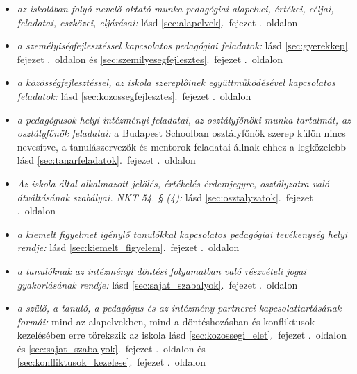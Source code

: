 \begin{itemize}
   

\item \emph{az iskolában folyó nevelő-oktató munka pedagógiai alapelvei, értékei, céljai, feladatai, eszközei, eljárásai: }    
       lásd        \ref{sec:alapelvek}.~fejezet .~oldalon
              
\item \emph{a személyiségfejlesztéssel kapcsolatos pedagógiai feladatok: }    
       lásd        \ref{sec:gyerekkep}. fejezet .~oldalon és 
              \ref{sec:szemilyesegfejlesztes}.~fejezet .~oldalon
              
\item \emph{a közösségfejlesztéssel, az iskola szereplőinek együttműködésével kapcsolatos feladatok: }    
       lásd        \ref{sec:kozossegfejlesztes}.~fejezet .~oldalon
              
\item \emph{a pedagógusok helyi intézményi feladatai, az osztályfőnöki munka tartalmát, az osztályfőnök feladatai: }   a Budapest Schoolban osztályfőnök szerep külön nincs nevesítve, a tanulászervezők és mentorok feladatai állnak ehhez a legközelebb 
       lásd        \ref{sec:tanarfeladatok}.~fejezet .~oldalon
              
\item \emph{Az iskola által alkalmazott jelölés, értékelés érdemjegyre, osztályzatra való átváltásának szabályai. NKT 54. § (4): }    
       lásd        \ref{sec:osztalyzatok}.~fejezet .~oldalon
              
\item \emph{a kiemelt figyelmet igénylő tanulókkal kapcsolatos pedagógiai tevékenység helyi rendje: }    
       lásd        \ref{sec:kiemelt_figyelem}.~fejezet .~oldalon
              
\item \emph{a tanulóknak az intézményi döntési folyamatban való részvételi jogai gyakorlásának rendje: }    
       lásd        \ref{sec:sajat_szabalyok}.~fejezet .~oldalon
              
\item \emph{a szülő, a tanuló, a pedagógus és az intézmény partnerei kapcsolattartásának formái: }   mind az alapelvekben, mind a döntéshozásban és konfliktusok kezelésében erre törekszik az iskola 
       lásd        \ref{sec:kozossegi_elet}.~fejezet .~oldalon és 
              \ref{sec:sajat_szabalyok}.~fejezet .~oldalon és 
              \ref{sec:konfliktusok_kezelese}.~fejezet .~oldalon
              

\end{itemize}
